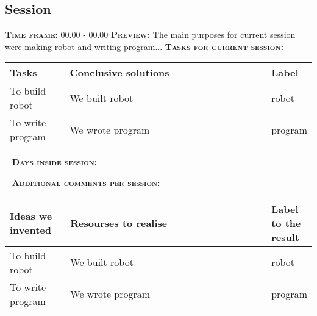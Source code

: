 \subsection{Session}
	\textsc{\textbf{Time frame:}} 00.00 - 00.00 \newline
	\textsc{\textbf{Preview:}} The main purposes for current session were making robot and writing program...\newline \newline
	\textsc{\textbf{Tasks for current session:}}

  \begin{table}[H]
	\vspace{-2mm}
	\begin{center}
		\begin{tabular}{|p{0.2\linewidth}|p{0.7\linewidth}|p{0.1\linewidth}|}
			\hline
			Tasks & Conclusive solutions & Label \\
			\hline
			To build robot & We built robot & robot \\
			\hline
			To write program & We wrote program & program \\
			\hline
		\end{tabular}
	\end{center}
  \end{table}
  
   \newline
  \textsc{\textbf{Days inside session:}}
  
  
  
   \newline
  \textsc{\textbf{Additional comments per session:}}
  
  \begin{table}[H]
  	\vspace{-2mm}
  	\begin{center}
  		\begin{tabular}{|p{0.2\linewidth}|p{0.7\linewidth}|p{0.1\linewidth}|}
  			\hline
  			Ideas we invented & Resourses to realise & Label to the result \\
  			\hline
  			To build robot & We built robot & robot \\
  			\hline
  			To write program & We wrote program & program \\
  			\hline
  		\end{tabular}
  	\end{center}
  \end{table}
  
\fillpage
